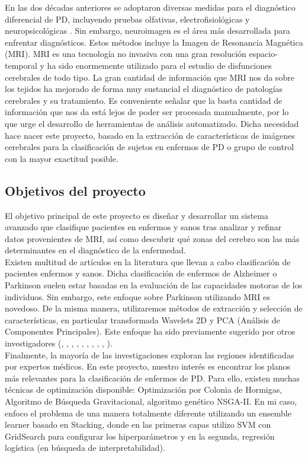 En las dos décadas anteriores se adoptaron diversas medidas para el diagnóstico diferencial de PD, incluyendo pruebas olfativas, electrofisiológicas y neuropsicológicas \cite{pruebas-ant}. Sin embargo, neuroimagen es el área más desarrollada para enfrentar diagnósticos. Estos métodos incluye la Imagen de Resonancia Magnética (MRI). MRI es una tecnología no invasiva con una gran resolución espacio-temporal y ha sido enormemente utilizado para el estudio de disfunciones cerebrales de todo tipo. La gran cantidad de información que MRI nos da sobre los tejidos ha mejorado de forma muy sustancial el diagnóstico de patologías cerebrales y su tratamiento. Es conveniente señalar que la basta cantidad de información que nos da está lejos de poder ser procesada manualmente, por lo que urge el desarrollo de herramientas de análisis automatizado. Dicha necesidad hace nacer este proyecto, basado en la extracción de características de imágenes cerebrales para la clasificación de sujetos en enfermos de PD o grupo de control con la mayor exactitud posible.

\subsection{Objetivos del proyecto}

El objetivo principal de este proyecto es diseñar y desarrollar un sistema avanzado que clasifique pacientes en enfermos y sanos tras analizar y refinar datos provenientes de MRI, así como descubrir qué zonas del cerebro son las más determinantes en el diagnóstico de la enfermedad. \\

Existen multitud de artículos en la literatura que llevan a cabo clasificación de pacientes enfermos y sanos. Dicha clasificación de enfermos de Alzheimer o Parkinson suelen estar basadas en la evaluación de las capacidades motoras de los individuos. Sin embargo, este enfoque sobre Parkinson utilizando MRI es novedoso. De la misma manera, utilizaremos métodos de extracción y selección de características, en particular transformada Wavelets 2D y PCA (Análisis de Componentes Principales). Este enfoque ha sido previamente sugerido por otros investigadores (\cite{aggarwal}, \cite{iman}, \cite{deepa}, \cite{mohd}, \cite{rajesh}, \cite{michel}, \cite{jing}, \cite{yudong}, \cite{irojas}, \cite{alberto}). \\

Finalmente, la mayoría de las investigaciones exploran las regiones identificadas por expertos médicos. En este proyecto, nuestro interés es encontrar los planos más relevantes para la clasificación de enfermos de PD. Para ello, existen muchas técnicas de optimización disponible: Optimización por Colonia de Hormigas, Algoritmo de Búsqueda Gravitacional, algoritmo genético NSGA-II. En mi caso, enfoco el problema de una manera totalmente diferente utilizando un ensemble learner basado en Stacking, donde en las primeras capas utilizo SVM con GridSearch para configurar los hiperparámetros y en la segunda, regresión logística (en búsqueda de interpretabilidad).

